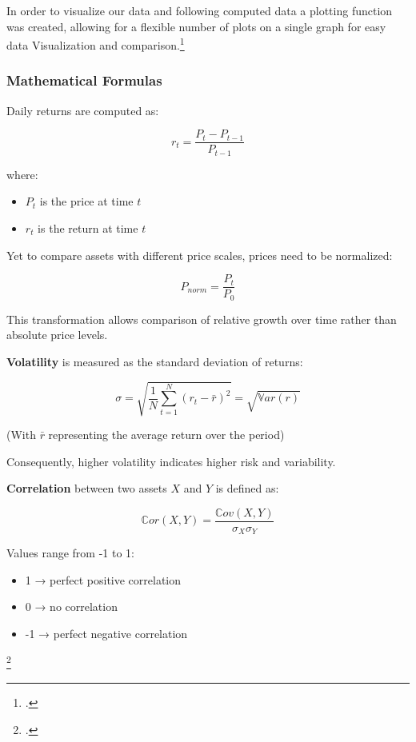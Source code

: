 \documentclass{article}
\begin{document}
In order to visualize our data and following computed data a plotting function was created, allowing for a flexible number of plots on a single graph for easy data Visualization and comparison.\footcite{matplotlib}

\subsubsection{Mathematical Formulas}

Daily returns are computed as:


$$ r_t = \frac{P_t - P_{t-1}}{P_{t-1}} $$


where:
\begin{itemize}
    \item $P_t$ is the price at time  $t$
    \item $r_t$ is the return at time $t$
\end{itemize}

Yet to compare assets with different price scales, prices need to be normalized:


$$ P_{norm} = \frac{P_t}{P_0} $$


This transformation allows comparison of relative growth over time rather than absolute price levels.

\vspace{0.3cm}

\textbf{Volatility} is measured as the standard deviation of returns:


$$ \sigma = \sqrt{\frac{1}{N} \sum_{t=1}^{N} (r_t - \bar{r})^2} = \sqrt{\mathbb{V}ar(r)} $$

(With $\bar{r}$ representing the average return over the period)

Consequently, higher volatility indicates higher risk and variability.
\vspace{0.3cm}

\textbf{Correlation} between two assets \( X \) and \( Y \) is defined as:


 $$\mathbb{C}or(X,Y) = \frac{\mathbb{C}ov(X,Y)}{\sigma_X \sigma_Y} $$


Values range from -1 to 1:
\begin{itemize}
    \item 1 → perfect positive correlation
    \item 0 → no correlation
    \item -1 → perfect negative correlation
\end{itemize}\footcite{sorbonne_datascience_course}
\end{document}
